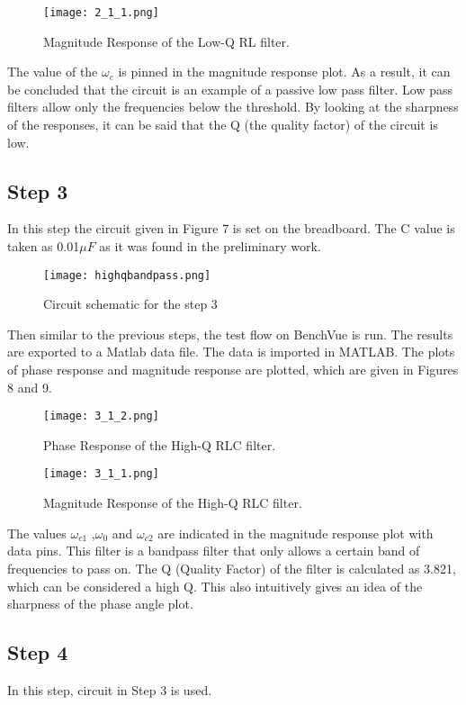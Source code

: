 \documentclass[letterpaper,12pt]{article}
\begin{document}
\begin{figure}[H]
    \centering
    \texttt{[image: 2\_1\_1.png]}
    \caption{Magnitude Response of the Low-Q RL filter.}
\end{figure} 
The value of the \(\omega_c\) is pinned in the magnitude response plot. As a result, it can be concluded that the circuit is an example of a passive low pass filter. Low pass filters allow only the frequencies below the threshold. By looking at the sharpness of the responses, it can be said that the Q (the quality factor) of the circuit is low. 
    
\subsection{Step 3}
In this step the circuit given in Figure 7 is set on the breadboard. The C value is taken as 0.01\(\mu F\) as it was found in the preliminary work. 
\begin{figure}[H]
    \centering
    \texttt{[image: highqbandpass.png]}
    \caption{Circuit schematic for the step 3}
\end{figure} 
Then similar to the previous steps, the test flow on BenchVue is run. The results are exported to a Matlab data file. The data is imported in MATLAB. The plots of phase response and magnitude response are plotted, which are given in Figures 8 and 9.
\begin{figure}[H]
    \centering
    \texttt{[image: 3\_1\_2.png]}
    \caption{Phase Response of the High-Q RLC filter.}
\end{figure} 

\begin{figure}[H]
    \centering
    \texttt{[image: 3\_1\_1.png]}
    \caption{Magnitude Response of the High-Q RLC filter.}
\end{figure} 
The values \(\omega_{c1}\) ,\(\omega_{0}\) and \(\omega_{c2}\)  are indicated in the magnitude response plot with data pins. This filter is a bandpass filter that only allows a certain band of frequencies to pass on. The Q (Quality Factor) of the filter is calculated as 3.821, which can be considered a high Q. This also intuitively gives an idea of the sharpness of the phase angle plot.  

\subsection{Step 4}
In this step, circuit in Step 3 is used.
\end{document}

